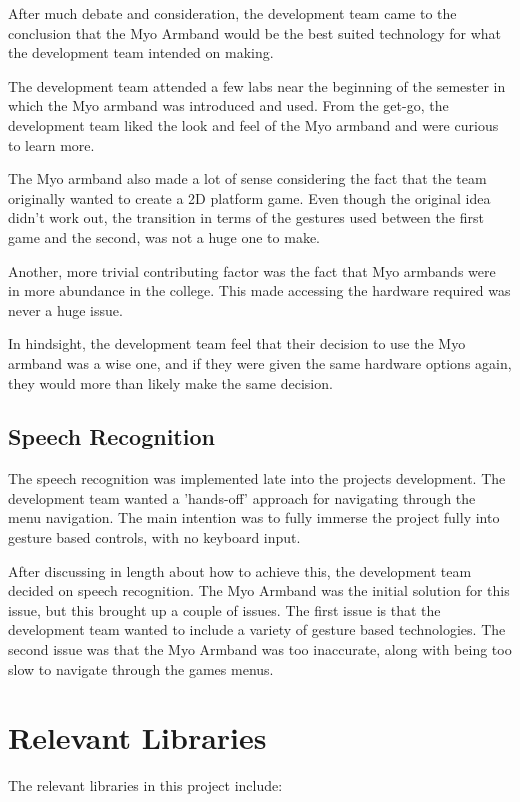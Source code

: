 \documentclass{article}
\begin{document}
After much debate and consideration, the development team came to the conclusion that the Myo Armband would be the best suited technology for what the development team intended on making. 

\bigskip

The development team attended a few labs near the beginning of the semester in which the Myo armband was introduced and used. From the get-go, the development team liked the look and feel of the Myo armband and were curious to learn more. 

The Myo armband also made a lot of sense considering the fact that the team originally wanted to create a 2D platform game. Even though the original idea didn't work out, the transition in terms of the gestures used between the first game and the second, was not a huge one to make. 

Another, more trivial contributing factor was the fact that Myo armbands were in more abundance in the college. This made accessing the hardware required was never a huge issue. 

\bigskip

In hindsight, the development team feel that their decision to use the Myo armband was a wise one, and if they were given the same hardware options again, they would more than likely make the same decision.

\subsection{Speech Recognition}
The speech recognition was implemented late into the projects development. The development team wanted a 'hands-off' approach for navigating through the menu navigation. The main intention was to fully immerse the project fully into gesture based controls, with no keyboard input.

\bigskip

After discussing in length about how to achieve this, the development team decided on speech recognition. The Myo Armband was the initial solution for this issue, but this brought up a couple of issues. The first issue is that the development team wanted to include a variety of gesture based technologies. The second issue was that the Myo Armband was too inaccurate, along with being too slow to navigate through the games menus.

\section{Relevant Libraries}
The relevant libraries in this project include:
\end{document}
